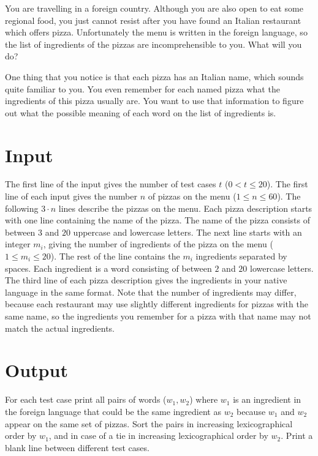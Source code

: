 You are travelling in a foreign country. Although you are also open to eat some
regional food, you just cannot resist after you have found an Italian restaurant which offers pizza.
Unfortunately the menu is written in the foreign language, so the list of ingredients of the pizzas
are incomprehensible to you. What will you do?

One thing that you notice is that each pizza has an Italian name, which sounds quite familiar to you.
You even remember for each named pizza what the ingredients of this pizza usually are. You want to use that
information to figure out what the possible meaning of each word on the list of ingredients is.

\section*{Input}
The first line of the input gives the number of test cases $t$ ($0 < t \le 20$).
The first line of each input gives the number $n$ of pizzas on the menu ($1 \le n \le 60$).
The following $3 \cdot n$ lines describe the pizzas on the menu.
Each pizza description starts with one line containing the name of the pizza. The name of the pizza consists of between $3$ and $20$ uppercase and lowercase letters.
The next line starts with an integer $m_i$, giving the number of ingredients of the pizza on the menu ($1 \le m_i \le 20$).
The rest of the line contains the $m_i$ ingredients separated by spaces.
Each ingredient is a word consisting of between $2$ and $20$ lowercase letters.
The third line of each pizza description gives the ingredients in your native language in the same format.
Note that the number of ingredients may differ, because each restaurant may use slightly different ingredients
for pizzas with the same name, so the ingredients you remember for a pizza with that name may not match the actual ingredients.

\section*{Output}
For each test case print all pairs of words ($w_1, w_2$) where
$w_1$ is an ingredient in the foreign language that could be the same ingredient as $w_2$ because $w_1$ and $w_2$ appear on the same set of pizzas.
Sort the pairs in increasing lexicographical order by $w_1$, and in case of a tie
in increasing lexicographical order by $w_2$.
Print a blank line between different test cases.
